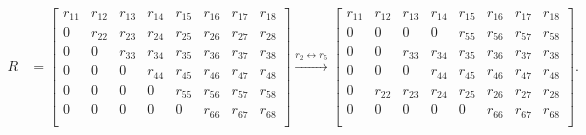 \documentclass[12pt]{article}
\numberwithin{equation}{section}
\begin{document}
\begin{align*}
R &=
  \begin{bmatrix}
 r_{11} & r_{12} & r_{13} & r_{14} & r_{15} & r_{16} & r_{17} & r_{18}\\
 0      & r_{22} & r_{23} & r_{24} & r_{25} & r_{26} & r_{27} & r_{28}\\
 0      & 0      & r_{33} & r_{34} & r_{35} & r_{36} & r_{37} & r_{38}\\
 0      & 0      & 0      & r_{44} & r_{45} & r_{46} & r_{47} & r_{48}\\
 0      & 0      & 0      & 0      & r_{55} & r_{56} & r_{57} & r_{58}\\
 0      & 0      & 0      & 0      & 0      & r_{66} & r_{67} & r_{68}\\
\end{bmatrix}
\xrightarrow{r_{2} \leftrightarrow r_{5}}
\begin{bmatrix}
 r_{11} & r_{12} & r_{13} & r_{14} & r_{15} & r_{16} & r_{17} & r_{18}\\
 0      & 0      & 0      & 0      & r_{55} & r_{56} & r_{57} & r_{58}\\
 0      & 0      & r_{33} & r_{34} & r_{35} & r_{36} & r_{37} & r_{38}\\
 0      & 0      & 0      & r_{44} & r_{45} & r_{46} & r_{47} & r_{48}\\
 0      & r_{22} & r_{23} & r_{24} & r_{25} & r_{26} & r_{27} & r_{28}\\
 0      & 0      & 0      & 0      & 0      & r_{66} & r_{67} & r_{68}\\
\end{bmatrix}.
\end{align*}\\
\end{document}
